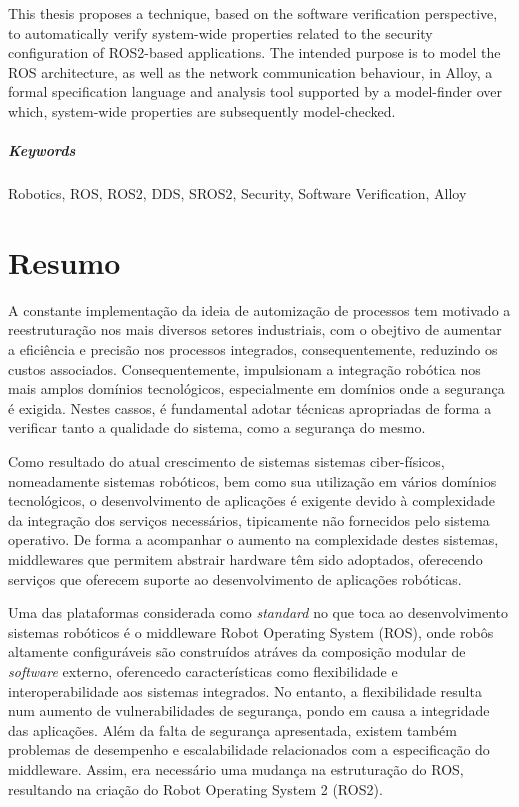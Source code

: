 \documentclass[
  oneside,
  11pt, a4paper,
  footinclude=true,
  headinclude=true,
  cleardoublepage=empty
]{scrbook}
\begin{document}
	This thesis proposes a technique, based on the software verification perspective, to automatically verify system-wide properties related to the security configuration of ROS2-based applications. The intended purpose is to model the ROS architecture, as well as the network communication behaviour, in Alloy\cite{alloy-DJ}, a formal specification language and analysis tool supported by a model-finder over which, system-wide properties are subsequently model-checked.

\paragraph{Keywords} Robotics, ROS, ROS2, DDS, SROS2, Security, Software Verification, Alloy
	\cleardoublepage

\chapter*{Resumo}

	A constante implementação da ideia de automização de processos tem motivado a reestruturação nos mais diversos setores industriais, com o obejtivo de aumentar a eficiência e precisão nos processos integrados, consequentemente, reduzindo os custos associados. Consequentemente, impulsionam a integração robótica nos mais amplos domínios tecnológicos, especialmente em domínios onde a segurança é exigida. Nestes cassos, é fundamental adotar técnicas apropriadas de forma a verificar tanto a qualidade do sistema, como a segurança do mesmo.

	Como resultado do atual crescimento de sistemas sistemas ciber-físicos, nomeadamente sistemas robóticos, bem como sua utilização em vários domínios tecnológicos, o desenvolvimento de aplicações é exigente devido à complexidade da integração dos serviços necessários, tipicamente não fornecidos pelo sistema operativo. De forma a acompanhar o aumento na complexidade destes sistemas, middlewares que permitem abstrair hardware têm sido adoptados, oferecendo serviços que oferecem suporte ao desenvolvimento de aplicações robóticas.

	Uma das plataformas considerada como \textit{standard} no que toca ao desenvolvimento sistemas robóticos é o middleware Robot Operating System (ROS)\cite{1}, onde robôs altamente configuráveis são construídos atráves da composição modular de \textit{software} externo, oferencedo características como flexibilidade e interoperabilidade aos sistemas integrados. No entanto, a flexibilidade resulta num aumento de vulnerabilidades de segurança, pondo em causa a integridade das aplicações. Além da falta de segurança apresentada, existem também problemas de desempenho e escalabilidade relacionados com a especificação do middleware. Assim, era necessário uma mudança na estruturação do ROS, resultando na criação do Robot Operating System 2 (ROS2).
\end{document}
